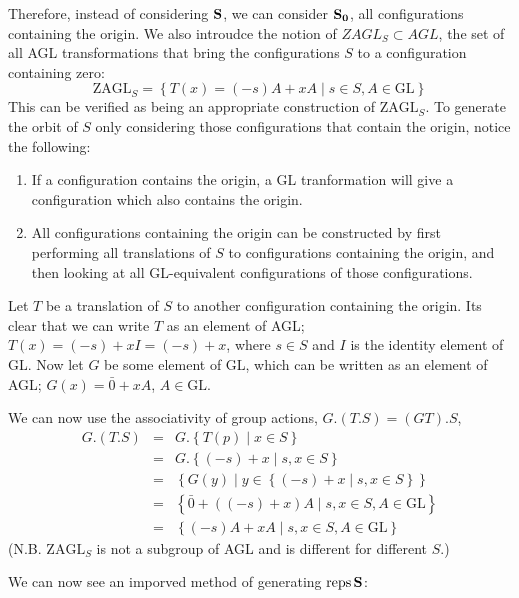\documentclass[12pt]{amsart}
\newenvironment{pf}{\proof[\proofname]}{\endproof}
\theoremstyle{plain}
\DeclareMathOperator{\Reps}{reps}
\begin{document}
Therefore, instead of considering $\bold{S}$, we can consider $\bold{S_0}$, all configurations containing the origin. We also introudce the notion of $ZAGL_S \subset AGL$, the set of all AGL transformations that bring the configurations $S$ to a configuration containing zero:
\begin{equation*}
\mathrm{ZAGL}_S = \left\{ T(x) = (-s)A + xA \mid s \in S, A \in \mathrm{GL} \right\}
\end{equation*}
This can be verified as being an appropriate construction of $\mathrm{ZAGL}_S$.
\begin{pf}
To generate the orbit of $S$ only considering those configurations that contain the origin, notice the following:
\begin{enumerate}
\item{}If a configuration contains the origin, a GL tranformation will give a configuration which also contains the origin.
\item{}All configurations containing the origin can be constructed by first performing all translations of $S$ to configurations containing the origin, and then looking at all GL-equivalent configurations of those configurations.
\end{enumerate}

Let $T$ be a translation of $S$ to another configuration containing the origin. Its clear that we can write $T$ as an element of AGL; $T(x) = (-s) + xI = (-s) + x$, where $s \in S$ and $I$ is the identity element of GL. Now let $G$ be some element of GL, which can be written as an element of AGL; $G(x) = \bar{0} + xA$, $A \in \mathrm{GL}$.

We can now use the associativity of group actions, $G.(T.S) = (GT).S$,
\begin{eqnarray*}
G.(T.S) & = & G.\left\{ T(p) \mid x \in S \right\}\\
& = & G.\left\{(-s) + x \mid s,x \in S \right\}\\
& = & \left\{ G(y) \mid y \in \left\{(-s) + x \mid s,x \in S \right\} \right\}\\
& = & \left\{\bar{0} + \left((-s) + x\right)A \mid s,x \in S, A \in \mathrm{GL} \right\}\\
& = & \left\{ (-s)A + xA \mid s,x \in S, A \in \mathrm{GL} \right\}
\end{eqnarray*}
\end{pf}
(N.B. $\mathrm{ZAGL}_S$ is not a subgroup of AGL and is different for different $S$.)

We can now see an imporved method of generating $\Reps \bold{S}$:
\end{document}
